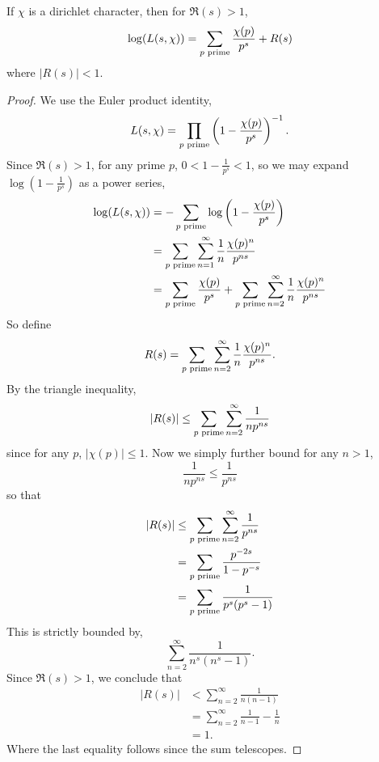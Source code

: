 \documentclass{unswmaths}
\begin{document}
    \begin{lemma}
    \label{euler}
        If $\chi$ is a dirichlet character, then for $\Re(s) > 1$,
        \begin{equation*}
            \log(L(s,\chi)) = \sum_{p\text{ prime}} \frac{\chi(p)}{p^s} + R(s)
        \end{equation*}
        where $|R(s)| < 1$.
    \end{lemma}
    \begin{proof}
        We use the Euler product identity,
        \begin{equation*}
            L(s,\chi) = \prod_{{p\text{ prime}}}\left(1-\frac{\chi(p)}{p^s}\right)^{-1}.
        \end{equation*}
        Since $\Re(s) > 1$, for any prime $p$, $0 < 1- \frac{1}{p^s} < 1$, so we may expand
        $\log(1-\frac{1}{p^s})$ as a power series,
        \begin{align*}
            \log(L(s,\chi)) &= -\sum_{{p\text{ prime}}} \log\left(1-\frac{\chi(p)}{p^s}\right)\\
            &= \sum_{{p\text{ prime}}} \sum_{n = 1}^\infty \frac{1}{n}\frac{\chi(p)^n}{p^{ns}}\\
            &= \sum_{{p\text{ prime}}} \frac{\chi(p)}{p^s} + \sum_{{p\text{ prime}}} \sum_{n=2}^\infty \frac{1}{n}\frac{\chi(p)^n}{p^{ns}}
        \end{align*}
        So define
        \begin{equation*}
            R(s) = \sum_{{p\text{ prime}}} \sum_{n=2}^\infty \frac{1}{n}\frac{\chi(p)^n}{p^{ns}}.
        \end{equation*}
        By the triangle inequality,
        \begin{equation*}
            |R(s)| \leq \sum_{{p\text{ prime}}} \sum_{n=2}^\infty \frac{1}{np^{ns}}
        \end{equation*}
        since for any $p$, $|\chi(p)| \leq 1$. Now we simply further bound for any $n > 1$,
        \begin{equation*}
            \frac{1}{np^{ns}} \leq \frac{1}{p^{ns}}
        \end{equation*}
        so that
        \begin{align*}
            |R(s)| &\leq \sum_{{p\text{ prime}}} \sum_{n=2}^\infty \frac{1}{p^{ns}}\\
            &= \sum_{{p\text{ prime}}} \frac{p^{-2s}}{1-p^{-s}}\\
            &= \sum_{{p\text{ prime}}} \frac{1}{p^s(p^s-1)}
        \end{align*}
        This is strictly bounded by,
        \begin{equation*}
            \sum_{n=2}^\infty \frac{1}{n^s(n^s-1)}.
        \end{equation*}
        Since $\Re(s) > 1$, we conclude that
        \begin{align*}
            |R(s)| &< \sum_{n=2}^\infty \frac{1}{n(n-1)}\\
            &= \sum_{n=2}^\infty \frac{1}{n-1}-\frac{1}{n}\\
            &= 1.
        \end{align*}
        Where the last equality follows since the sum telescopes.
    \end{proof}
    
\end{document}
